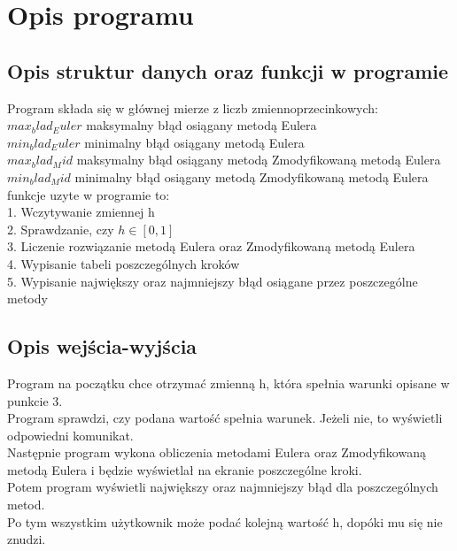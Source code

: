 \documentclass[10pt]{article} %
\begin{document}
\section{Opis programu}
\subsection{Opis struktur danych oraz funkcji w programie}
Program składa się w głównej mierze z liczb zmiennoprzecinkowych:\\
$max_blad_Euler$ maksymalny błąd osiągany metodą Eulera\\
$min_blad_Euler$ minimalny błąd osiągany metodą Eulera\\
$max_blad_Mid$ maksymalny błąd osiągany metodą Zmodyfikowaną metodą Eulera\\
$min_blad_Mid$ minimalny błąd osiągany metodą Zmodyfikowaną metodą Eulera\\
\Najwazniejsze funkcje uzyte w programie to:\\
1. Wczytywanie zmiennej h\\
2. Sprawdzanie, czy $h \in [0,1]$\\
3. Liczenie rozwiązanie metodą Eulera oraz Zmodyfikowaną metodą Eulera\\
4. Wypisanie tabeli poszczególnych kroków\\
5. Wypisanie największy oraz najmniejszy błąd osiągane przez poszczególne metody\\
\subsection{Opis wejścia-wyjścia}
Program na początku chce otrzymać zmienną h, która spełnia warunki opisane w punkcie 3.\\
Program sprawdzi, czy podana wartość spełnia warunek. Jeżeli nie, to wyświetli odpowiedni komunikat.\\
Następnie program wykona obliczenia metodami Eulera oraz Zmodyfikowaną metodą Eulera i będzie wyświetlał na ekranie poszczególne kroki.\\
Potem program wyświetli największy oraz najmniejszy błąd dla poszczególnych metod.\\
Po tym wszystkim użytkownik może podać kolejną wartość h, dopóki mu się nie znudzi.\\
\end{document}
